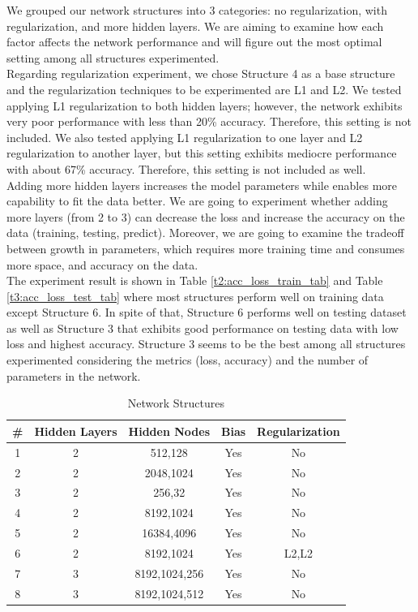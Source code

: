 \documentclass{article}
\begin{document}
We grouped our network structures into 3 categories: no regularization, with regularization, and more hidden layers. We are aiming to examine how each factor affects the network performance and will figure out the most optimal setting among all structures experimented.
\\
Regarding regularization experiment, we chose Structure 4 as a base structure and the regularization techniques to be experimented are L1 and L2. We tested applying L1 regularization to both hidden layers; however, the network exhibits very poor performance with less than 20\% accuracy. Therefore, this setting is not included. We also tested applying L1 regularization to one layer and L2 regularization to another layer, but this setting exhibits mediocre performance with about 67\% accuracy. Therefore, this setting is not included as well.
\\
Adding more hidden layers increases the model parameters while enables more capability to fit the data better. We are going to experiment whether adding more layers (from 2 to 3) can decrease the loss and increase the accuracy on the data (training, testing, predict). Moreover, we are going to examine the tradeoff between growth in parameters, which requires more training time and consumes more space, and accuracy on the data.
\\
The experiment result is shown in Table \ref{t2:acc_loss_train_tab} and Table \ref{t3:acc_loss_test_tab} where most structures perform well on training data except Structure 6. In spite of that, Structure 6 performs well on testing dataset as well as Structure 3 that exhibits good performance on testing data with low loss and highest accuracy. Structure 3 seems to be the best among all structures experimented considering the metrics (loss, accuracy) and the number of parameters in the network.

\begin{table}[h]
    \centering
    \begin{tabular}{|c|c|c|c|c|}
        \hline
         \#&Hidden Layers&Hidden Nodes&Bias&Regularization\\
         \hline
         1&2&512,128&Yes&No\\
         \hline
         2&2&2048,1024&Yes&No\\
         \hline
         3&2&256,32&Yes&No\\
         \hline
         4&2&8192,1024&Yes&No\\
         \hline
         5&2&16384,4096&Yes&No\\
         \hline
         6&2&8192,1024&Yes&L2,L2\\
         \hline
         7&3&8192,1024,256&Yes&No\\
         \hline
         8&3&8192,1024,512&Yes&No\\
         \hline
    \end{tabular}
    \caption{Network Structures}
    \label{t1:net_struct}
\end{table}
\end{document}
